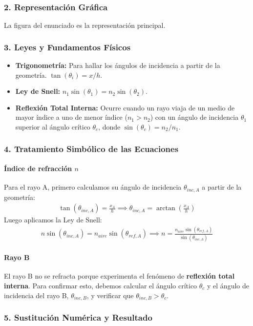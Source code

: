 \subsubsection*{2. Representación Gráfica}
La figura del enunciado es la representación principal.
\subsubsection*{3. Leyes y Fundamentos Físicos}
\begin{itemize}
    \item \textbf{Trigonometría:} Para hallar los ángulos de incidencia a partir de la geometría. $\tan(\theta_i) = x/h$.
    \item \textbf{Ley de Snell:} $n_1 \sin(\theta_1) = n_2 \sin(\theta_2)$.
    \item \textbf{Reflexión Total Interna:} Ocurre cuando un rayo viaja de un medio de mayor índice a uno de menor índice ($n_1>n_2$) con un ángulo de incidencia $\theta_1$ superior al ángulo crítico $\theta_c$, donde $\sin(\theta_c)=n_2/n_1$.
\end{itemize}
\subsubsection*{4. Tratamiento Simbólico de las Ecuaciones}
\paragraph{Índice de refracción $n$}
Para el rayo A, primero calculamos su ángulo de incidencia $\theta_{inc,A}$ a partir de la geometría:
\begin{gather}
    \tan(\theta_{inc,A}) = \frac{x_A}{h} \implies \theta_{inc,A} = \arctan\left(\frac{x_A}{h}\right)
\end{gather}
Luego aplicamos la Ley de Snell:
\begin{gather}
    n \sin(\theta_{inc,A}) = n_{aire} \sin(\theta_{ref,A}) \implies n = \frac{n_{aire} \sin(\theta_{ref,A})}{\sin(\theta_{inc,A})}
\end{gather}
\paragraph{Rayo B}
El rayo B no se refracta porque experimenta el fenómeno de \textbf{reflexión total interna}. Para confirmar esto, debemos calcular el ángulo crítico $\theta_c$ y el ángulo de incidencia del rayo B, $\theta_{inc,B}$, y verificar que $\theta_{inc,B} > \theta_c$.
\subsubsection*{5. Sustitución Numérica y Resultado}
